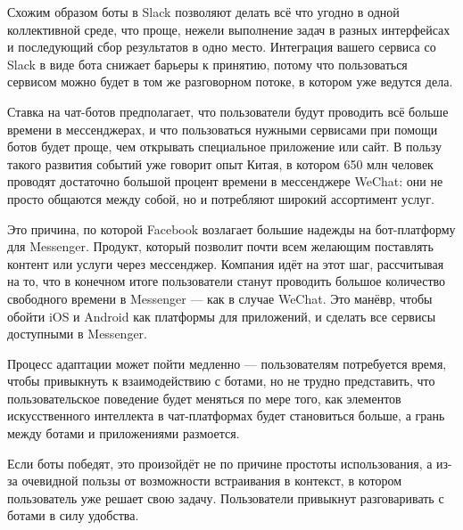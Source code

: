 Схожим образом боты в Slack позволяют делать всё что угодно в одной коллективной среде, что проще, нежели выполнение задач в разных интерфейсах и последующий сбор результатов в одно место. Интеграция вашего сервиса со Slack в виде бота снижает барьеры к принятию, потому что пользоваться сервисом можно будет в том же разговорном потоке, в котором уже ведутся дела.

Ставка на чат-ботов предполагает, что пользователи будут проводить всё больше времени в мессенджерах, и что пользоваться нужными сервисами при помощи ботов будет проще, чем открывать специальное приложение или сайт. В пользу такого развития событий уже говорит опыт Китая, в котором 650 млн человек проводят достаточно большой процент времени в мессенджере WeChat: они не просто общаются между собой, но и потребляют широкий ассортимент услуг.

Это причина, по которой Facebook возлагает большие надежды на бот-платформу для Messenger. Продукт, который позволит почти всем желающим поставлять контент или услуги через мессенджер. Компания идёт на этот шаг, рассчитывая на то, что в конечном итоге пользователи станут проводить большое количество свободного времени в Messenger — как в случае WeChat. Это манёвр, чтобы обойти iOS и Android как платформы для приложений, и сделать все сервисы доступными в Messenger.

Процесс адаптации может пойти медленно — пользователям потребуется время, чтобы привыкнуть к взаимодействию с ботами, но не трудно представить, что пользовательское поведение будет меняться по мере того, как элементов искусственного интеллекта в чат-платформах будет становиться больше, а грань между ботами и приложениями размоется.

Если боты победят, это произойдёт не по причине простоты использования, а из-за очевидной пользы от возможности встраивания в контекст, в котором пользователь уже решает свою задачу. Пользователи привыкнут разговаривать с ботами в силу удобства.